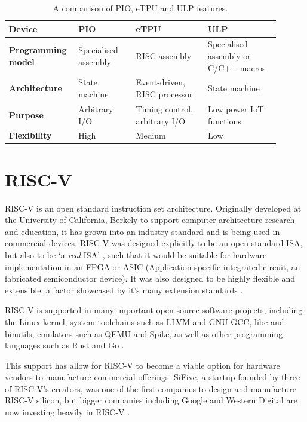 \begin{table}[h!]
    \centering
    \begin{tabular}{|p{0.2\linewidth}|p{0.2\linewidth}|p{0.25\linewidth}|p{0.25\linewidth}|}
        \hline
        \textbf{Device}            & \textbf{PIO}         & \textbf{eTPU}                 & \textbf{ULP}                         \\ \hline
        \textbf{Programming model} & Specialised assembly & RISC assembly                 & Specialised assembly or C/C++ macros \\ \hline
        \textbf{Architecture}      & State machine        & Event-driven, RISC processor  & State machine                        \\ \hline
        \textbf{Purpose}           & Arbitrary I/O        & Timing control, arbitrary I/O & Low power IoT functions              \\ \hline
        \textbf{Flexibility}       & High                 & Medium                        & Low                                  \\ \hline
    \end{tabular}
    \caption{A comparison of PIO, eTPU and ULP features.}
    \label{tab:comparison}
\end{table}

\section{RISC-V}

RISC-V is an open standard instruction set architecture. Originally developed at the University of California, Berkely to support computer architecture research and education, it has grown into an industry standard and is being used in commercial devices. RISC-V was designed explicitly to be an open standard ISA, but also to be `a \textit{real} ISA' \cite{riscv_design}, such that it would be suitable for hardware implementation in an FPGA or ASIC (Application-specific integrated circuit, an fabricated semiconductor device). It was also designed to be highly flexible and extensible, a factor showcased by it's many extension standards \cite{riscv_spec}.

RISC-V is supported in many important open-source software projects, including the Linux kernel, system toolchains such as LLVM and GNU GCC, libc and binutils, emulators such as QEMU and Spike, as well as other programming languages such as Rust and Go \cite{riscv_wiki}.

This support has allow for RISC-V to become a viable option for hardware vendors to manufacture commercial offerings. SiFive, a startup founded by three of RISC-V's creators, was one of the first companies to design and manufacture RISC-V silicon, but bigger companies including Google and Western Digital are now investing heavily in RISC-V \cite{riscv_article}.

